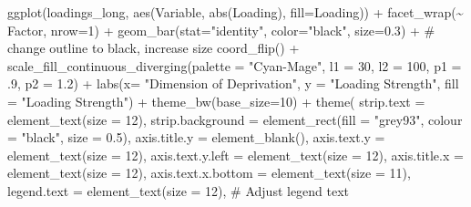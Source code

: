 \documentclass[
  letterpaper,
  DIV=11,
  numbers=noendperiod]{scrreprt}
\newenvironment{Shaded}{\begin{snugshade}}{\end{snugshade}}
\newcommand{\AttributeTok}[1]{\textcolor[rgb]{0.40,0.45,0.13}{#1}}
\newcommand{\CommentTok}[1]{\textcolor[rgb]{0.37,0.37,0.37}{#1}}
\newcommand{\DecValTok}[1]{\textcolor[rgb]{0.68,0.00,0.00}{#1}}
\newcommand{\FloatTok}[1]{\textcolor[rgb]{0.68,0.00,0.00}{#1}}
\newcommand{\FunctionTok}[1]{\textcolor[rgb]{0.28,0.35,0.67}{#1}}
\newcommand{\NormalTok}[1]{\textcolor[rgb]{0.00,0.23,0.31}{#1}}
\newcommand{\SpecialCharTok}[1]{\textcolor[rgb]{0.37,0.37,0.37}{#1}}
\newcommand{\StringTok}[1]{\textcolor[rgb]{0.13,0.47,0.30}{#1}}
\begin{document}
\begin{Shaded}
\begin{Highlighting}[]
\FunctionTok{ggplot}\NormalTok{(loadings\_long, }\FunctionTok{aes}\NormalTok{(Variable, }\FunctionTok{abs}\NormalTok{(Loading), }\AttributeTok{fill=}\NormalTok{Loading)) }\SpecialCharTok{+} 
  \FunctionTok{facet\_wrap}\NormalTok{(}\SpecialCharTok{\textasciitilde{}}\NormalTok{ Factor, }\AttributeTok{nrow=}\DecValTok{1}\NormalTok{) }\SpecialCharTok{+} 
  \FunctionTok{geom\_bar}\NormalTok{(}\AttributeTok{stat=}\StringTok{"identity"}\NormalTok{, }\AttributeTok{color=}\StringTok{"black"}\NormalTok{, }\AttributeTok{size=}\FloatTok{0.3}\NormalTok{) }\SpecialCharTok{+}  \CommentTok{\# change outline to black, increase size}
  \FunctionTok{coord\_flip}\NormalTok{() }\SpecialCharTok{+} 
  \FunctionTok{scale\_fill\_continuous\_diverging}\NormalTok{(}\AttributeTok{palette =} \StringTok{"Cyan{-}Mage"}\NormalTok{, }\AttributeTok{l1 =} \DecValTok{30}\NormalTok{, }\AttributeTok{l2 =} \DecValTok{100}\NormalTok{, }\AttributeTok{p1 =}\NormalTok{ .}\DecValTok{9}\NormalTok{, }\AttributeTok{p2 =} \FloatTok{1.2}\NormalTok{) }\SpecialCharTok{+}
  \FunctionTok{labs}\NormalTok{(}\AttributeTok{x=} \StringTok{"Dimension of Deprivation"}\NormalTok{, }\AttributeTok{y =} \StringTok{"Loading Strength"}\NormalTok{, }\AttributeTok{fill =} \StringTok{"Loading Strength"}\NormalTok{) }\SpecialCharTok{+}
  \FunctionTok{theme\_bw}\NormalTok{(}\AttributeTok{base\_size=}\DecValTok{10}\NormalTok{) }\SpecialCharTok{+}
  \FunctionTok{theme}\NormalTok{(}
    \AttributeTok{strip.text =} \FunctionTok{element\_text}\NormalTok{(}\AttributeTok{size =} \DecValTok{12}\NormalTok{),}
    \AttributeTok{strip.background =} \FunctionTok{element\_rect}\NormalTok{(}\AttributeTok{fill =} \StringTok{"grey93"}\NormalTok{, }\AttributeTok{colour =} \StringTok{"black"}\NormalTok{, }\AttributeTok{size =} \FloatTok{0.5}\NormalTok{),}
    \AttributeTok{axis.title.y =} \FunctionTok{element\_blank}\NormalTok{(),}
    \AttributeTok{axis.text.y =} \FunctionTok{element\_text}\NormalTok{(}\AttributeTok{size =} \DecValTok{12}\NormalTok{),}
    \AttributeTok{axis.text.y.left =} \FunctionTok{element\_text}\NormalTok{(}\AttributeTok{size =} \DecValTok{12}\NormalTok{),}
    \AttributeTok{axis.title.x =} \FunctionTok{element\_text}\NormalTok{(}\AttributeTok{size =} \DecValTok{12}\NormalTok{),}
    \AttributeTok{axis.text.x.bottom =} \FunctionTok{element\_text}\NormalTok{(}\AttributeTok{size =} \DecValTok{11}\NormalTok{),}
    \AttributeTok{legend.text =} \FunctionTok{element\_text}\NormalTok{(}\AttributeTok{size =} \DecValTok{12}\NormalTok{),  }\CommentTok{\# Adjust legend text}

\end{Highlighting}
\end{Shaded}
\end{document}
